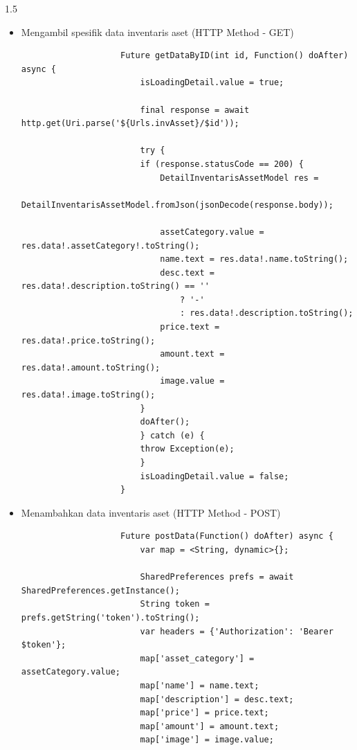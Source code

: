 \begin{spacing}{1.5}
\begin{enumerate}
\begin{enumerate}
\begin{itemize}
\begin{lstlisting}
					  SharedPreferences prefs = await SharedPreferences.getInstance();
					  String token = prefs.getString('token').toString();
					  var headers = {'Authorization': 'Bearer $token'};
				  
					  final response = await http.get(
						Uri.parse('${Urls.invAsset}?type=$type&start_date=$first&end_date=$last'),
						headers: headers,
					  );
				  
					  try {
						if (response.statusCode == 200) {
						  InventarisAssetModel res =
							  InventarisAssetModel.fromJson(jsonDecode(response.body));
				  
						  assetList.value = res;
				  
						  doAfter();
						}
					  } catch (e) {
						throw Exception(e);
					  }
					  isLoadingPage.value = false;
					}
				\end{lstlisting}

				\item Mengambil spesifik data inventaris aset (HTTP Method - GET)
				
				\begin{lstlisting}
					Future getDataByID(int id, Function() doAfter) async {
						isLoadingDetail.value = true;

						final response = await http.get(Uri.parse('${Urls.invAsset}/$id'));

						try {
						if (response.statusCode == 200) {
							DetailInventarisAssetModel res =
								DetailInventarisAssetModel.fromJson(jsonDecode(response.body));

							assetCategory.value = res.data!.assetCategory!.toString();
							name.text = res.data!.name.toString();
							desc.text = res.data!.description.toString() == ''
								? '-'
								: res.data!.description.toString();
							price.text = res.data!.price.toString();
							amount.text = res.data!.amount.toString();
							image.value = res.data!.image.toString();
						}
						doAfter();
						} catch (e) {
						throw Exception(e);
						}
						isLoadingDetail.value = false;
					}
				\end{lstlisting}

				\item Menambahkan data inventaris aset (HTTP Method - POST)
				
				\begin{lstlisting}
					Future postData(Function() doAfter) async {
						var map = <String, dynamic>{};
					
						SharedPreferences prefs = await SharedPreferences.getInstance();
						String token = prefs.getString('token').toString();
						var headers = {'Authorization': 'Bearer $token'};
						map['asset_category'] = assetCategory.value;
						map['name'] = name.text;
						map['description'] = desc.text;
						map['price'] = price.text;
						map['amount'] = amount.text;
						map['image'] = image.value;
					

\end{lstlisting}
\end{itemize}
\end{enumerate}
\end{enumerate}
\end{spacing}
